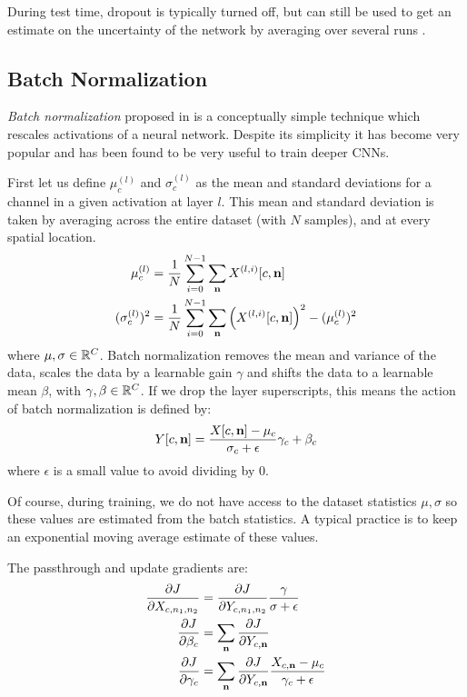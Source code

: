 During test time, dropout is typically turned off, but can still be
used to get an estimate on the uncertainty of the network by averaging over
several runs \cite{gal_dropout_2016}.

\subsection{Batch Normalization}
\emph{Batch normalization} proposed in \cite{ioffe_batch_2015} is a conceptually 
simple technique which rescales activations of a neural network. Despite its
simplicity it has become very popular and has been found to be very useful to
train deeper CNNs. 

First let us define $\mu_c^{(l)}$ and $\sigma_c^{(l)}$ as the mean and standard deviations 
for a channel in a given activation at layer $l$. This mean and standard deviation is taken by
averaging across the entire dataset (with $N$ samples), and at every spatial location.
\begin{align}
  \mu_c^{(l)} &= \frac{1}{N}\sum_{i=0}^{N-1} \sum_\nn X^{(l, i)}[c, \nn] \\
  (\sigma_c^{(l)})^2 &=  \frac{1}{N} \sum_{i=0}^{N-1} \sum_\nn \left(X^{(l, i)}[c, \nn]\right)^2 - (\mu^{(l)}_c)^2
\end{align}
where $\mu, \sigma \in \reals[C]$.
Batch normalization removes the mean and variance of the data, scales the data
by a learnable gain $\gamma$ and shifts the data to a learnable mean $\beta$,
with $\gamma, \beta \in \reals[C]$. If we drop the layer superscripts, this
means the action of batch normalization is defined by:
\begin{equation}
  Y[c, \nn] = \frac{X[c, \nn] - \mu_c}{\sigma_c + \epsilon}\gamma_c + \beta_c
\end{equation}
where $\epsilon$ is a small value to avoid dividing by 0.

Of course, during training, we do not have access to the dataset statistics $\mu, \sigma$
so these values are estimated from the batch statistics. A typical practice
is to keep an exponential moving average estimate of these values.

The passthrough and update gradients are:
\begin{align}
  \dydx{J}{X_{c, n_1, n_2}} &= \dydx{J}{Y_{c, n_1, n_2}}\frac{\gamma}{\sigma + \epsilon}\\
  \dydx{J}{\beta_c} &=  \sum_\nn \dydx{J}{Y_{c, \nn}}\\
  \dydx{J}{\gamma_c} &= \sum_\nn \dydx{J}{Y_{c, \nn}}\frac{X_{c, \nn} - \mu_c}{\gamma_c + \epsilon}
\end{align}

